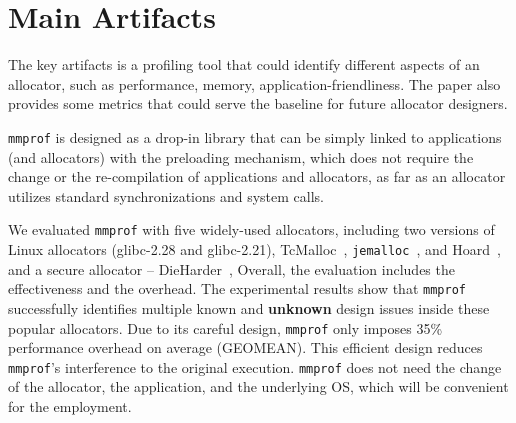 \documentclass[pageno]{jpaper}
\newcommand{\MP}{\texttt{mmprof}}
\begin{document}


\section{Main Artifacts}
\label{sec:main-artifacts}


The key artifacts is a profiling tool that could identify different aspects of an allocator, such as performance, memory, application-friendliness. The paper also provides some metrics that could serve the baseline for future allocator designers. 

\MP{} is designed as a drop-in library that can be simply linked to applications (and allocators) with the preloading mechanism, which does not require the change or the re-compilation of applications and allocators, as far as an allocator utilizes standard synchronizations and system calls.

We evaluated \MP{} with five widely-used allocators, including two versions of Linux allocators (glibc-2.28 and glibc-2.21), TcMalloc~\cite{tcmalloc}, \texttt{jemalloc}~\cite{jemalloc},  and Hoard~\cite{Hoard}, and  a secure allocator -- DieHarder~\cite{DieHarder},  Overall, the evaluation includes the effectiveness and the overhead. The experimental results show that \MP{} successfully identifies multiple known and \textbf{unknown} design issues inside these popular allocators. Due to its careful design, \MP{} only imposes 35\% performance overhead on average (GEOMEAN). This efficient design reduces \MP{}'s interference to the original execution. \MP{} does not need the change of the allocator, the application, and the underlying OS, which will be convenient for the employment. 


\end{document}
